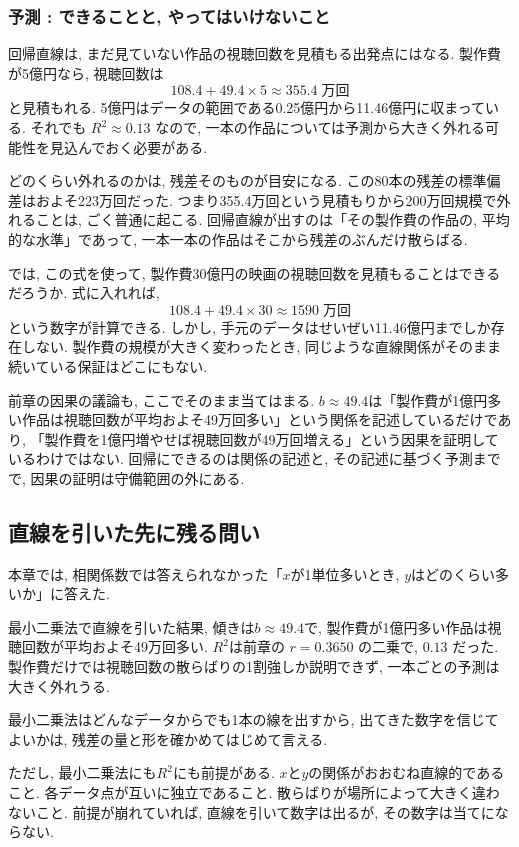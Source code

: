 \subsubsection*{予測 : できることと, やってはいけないこと}

回帰直線は, まだ見ていない作品の視聴回数を見積もる出発点にはなる.
製作費が5億円なら, 視聴回数は
\[
  108.4 + 49.4 \times 5 \approx 355.4\;\text{万回}
\]
と見積もれる.
5億円はデータの範囲である0.25億円から11.46億円に収まっている.
それでも $R^2 \approx 0.13$ なので, 一本の作品については予測から大きく外れる可能性を見込んでおく必要がある.

どのくらい外れるのかは, 残差そのものが目安になる.
この80本の残差の標準偏差はおよそ223万回だった.
つまり355.4万回という見積もりから200万回規模で外れることは, ごく普通に起こる.
回帰直線が出すのは「その製作費の作品の, 平均的な水準」であって, 一本一本の作品はそこから残差のぶんだけ散らばる.

では, この式を使って, 製作費30億円の映画の視聴回数を見積もることはできるだろうか.
式に入れれば,
\[
  108.4 + 49.4 \times 30 \approx 1590\;\text{万回}
\]
という数字が計算できる.
しかし, 手元のデータはせいぜい11.46億円までしか存在しない.
製作費の規模が大きく変わったとき, 同じような直線関係がそのまま続いている保証はどこにもない.

前章の因果の議論も, ここでそのまま当てはまる.
$b \approx 49.4$は「製作費が1億円多い作品は視聴回数が平均およそ49万回多い」という関係を記述しているだけであり, 「製作費を1億円増やせば視聴回数が49万回増える」という因果を証明しているわけではない.
回帰にできるのは関係の記述と, その記述に基づく予測までで, 因果の証明は守備範囲の外にある.


\subsection{直線を引いた先に残る問い}

本章では, 相関係数では答えられなかった「$x$が1単位多いとき, $y$はどのくらい多いか」に答えた.

最小二乗法で直線を引いた結果, 傾きは$b \approx 49.4$で, 製作費が1億円多い作品は視聴回数が平均およそ49万回多い.
$R^2$は前章の $r = 0.3650$ の二乗で, $0.13$ だった.
製作費だけでは視聴回数の散らばりの1割強しか説明できず, 一本ごとの予測は大きく外れうる.

最小二乗法はどんなデータからでも1本の線を出すから, 出てきた数字を信じてよいかは, 残差の量と形を確かめてはじめて言える.

ただし, 最小二乗法にも$R^2$にも前提がある.
$x$と$y$の関係がおおむね直線的であること.
各データ点が互いに独立であること.
散らばりが場所によって大きく違わないこと.
前提が崩れていれば, 直線を引いて数字は出るが, その数字は当てにならない.

